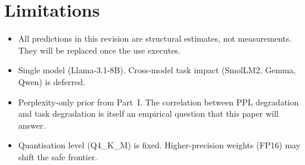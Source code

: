 \documentclass[11pt]{article}
\begin{document}
\section{Limitations}
\label{sec:limits}

\begin{itemize}
\item All predictions in this revision are structural estimates, not
      measurements.  They will be replaced once the use executes.
\item Single model (Llama-3.1-8B).  Cross-model task impact (SmolLM2,
      Gemma, Qwen) is deferred.
\item Perplexity-only prior from Part~I.  The correlation between PPL
      degradation and task degradation is itself an empirical question
      that this paper will answer.
\item Quantisation level (Q4\_K\_M) is fixed.  Higher-precision weights
      (FP16) may shift the safe frontier.
\end{itemize}

\printbibliography
\end{document}
